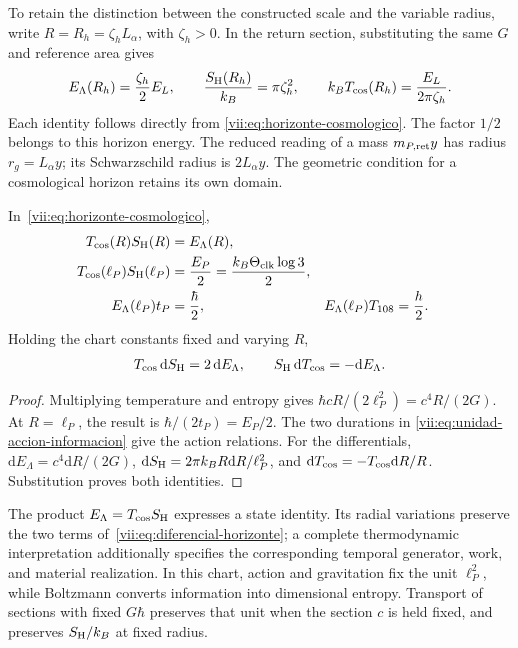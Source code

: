 To retain the distinction between the constructed scale and the variable
radius, write \(R=R_h=\zeta_hL_\alpha\), with \(\zeta_h>0\).
In the return section, substituting the same \(G\) and reference area
gives
\[
 E_\Lambda(R_h)=\frac{\zeta_h}{2}E_L,\qquad
 \frac{S_{\rm H}(R_h)}{k_B}=\pi\zeta_h^2,\qquad
 k_BT_{\rm cos}(R_h)=\frac{E_L}{2\pi\zeta_h}.
\]
Each identity follows directly from
\eqref{vii:eq:horizonte-cosmologico}. The factor \(1/2\) belongs
to this horizon energy. The reduced reading of a mass
\(m_{P,\rm ret}y\) has radius \(r_g=L_\alpha y\); its Schwarzschild
radius is \(2L_\alpha y\). The geometric condition for a cosmological
horizon retains its own domain.

\begin{theorem}
\label{vii:thm:celda-media-accion}
In~\eqref{vii:eq:horizonte-cosmologico},
\begin{align}
 T_{\rm cos}(R)S_{\rm H}(R)&=E_\Lambda(R),\\
 T_{\rm cos}(\ell_P)S_{\rm H}(\ell_P)
 &=\frac{E_P}{2}=\frac{k_B\Theta_{\rm clk}\log3}{2},\\
 E_\Lambda(\ell_P)t_P&=\frac{\hbar}{2},&
 E_\Lambda(\ell_P)T_{108}&=\frac h2.
 \label{vii:eq:media-accion-horizonte}
\end{align}
Holding the chart constants fixed and varying \(R\),
\begin{equation}
 T_{\rm cos}\,\mathrm dS_{\rm H}=2\,\mathrm dE_\Lambda,
 \qquad S_{\rm H}\,\mathrm dT_{\rm cos}=-\mathrm dE_\Lambda.
 \label{vii:eq:diferencial-horizonte}
\end{equation}
\end{theorem}
\begin{proof}
Multiplying temperature and entropy gives
\(\hbar cR/(2\ell_P^2)=c^4R/(2G)\).
At \(R=\ell_P\), the result is
\(\hbar/(2t_P)=E_P/2\). The two durations in
\eqref{vii:eq:unidad-accion-informacion} give the action relations.
For the differentials,
\(\mathrm dE_\Lambda=c^4\mathrm dR/(2G)\),
\(\mathrm dS_{\rm H}=2\pi k_BR\mathrm dR/\ell_P^2\), and
\(\mathrm dT_{\rm cos}=-T_{\rm cos}\mathrm dR/R\).
Substitution proves both identities.
\end{proof}

The product \(E_\Lambda=T_{\rm cos}S_{\rm H}\) expresses a
state identity. Its radial variations preserve the two terms
of~\eqref{vii:eq:diferencial-horizonte}; a complete thermodynamic
interpretation additionally specifies the corresponding temporal generator,
work, and material realization. In this chart, action and
gravitation fix the unit \(\ell_P^2\), while Boltzmann converts
information into dimensional entropy. Transport of sections with
fixed \(G\hbar\) preserves that unit when the section \(c\) is
held fixed, and preserves \(S_{\rm H}/k_B\) at fixed radius.

